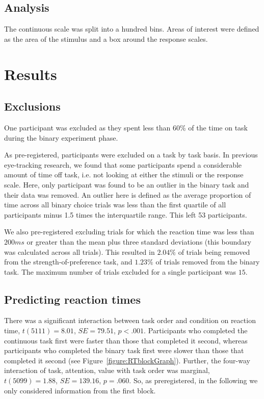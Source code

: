 \documentclass[12pt]{article}
\begin{document}
\subsection{Analysis}
The continuous scale was split into a hundred bins. Areas of interest were defined as the area of the stimulus and a box around the response scales. 

\section{Results}

\subsection{Exclusions}
One participant was excluded as they spent less than 60\% of the time on task during the binary experiment phase. 

As pre-registered, participants were excluded on a task by task basis. In previous eye-tracking research, we found that some participants spend a considerable amount of time off task, i.e. not looking at either the stimuli or the response scale. Here, only participant was found to be an outlier in the binary task and their data was removed. An outlier here is defined as the average proportion of time across all binary choice trials was less than the first quartile of all participants minus 1.5 times the interquartile range. This left 53 participants. 

We also pre-registered excluding trials for which the reaction time was less than $200ms$ or greater than the mean plus three standard deviations (this boundary was calculated across all trials). This resulted in $2.04\%$ of trials being removed from the strength-of-preference task, and $1.23\%$ of trials removed from the binary task. The maximum number of trials excluded for a single participant was $15$. 

\subsection{Predicting reaction times}
There was a significant interaction between task order and condition on reaction time, $t(5111)=8.01$, $SE=79.51$, $p<.001$. Participants who completed the continuous task first were faster than those that completed it second, whereas participants who completed the binary task first were slower than those that completed it second (see Figure~\ref{figure:RTblockGraph}). Further, the four-way interaction of task, attention, value with task order was marginal, $t(5099)=1.88$, $SE=139.16$, $p=.060$. So, as preregistered, in the following we only considered information from the first block. 
\end{document}
